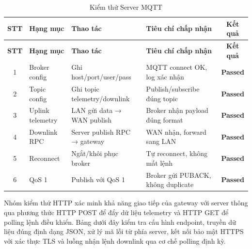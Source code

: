         \begin{longtable}{|c|p{3cm}|p{4cm}|p{5cm}|c|}
            \caption{Kiểm thử Server MQTT}
            \label{tab:test_mqtt} \\
            \hline
            \textbf{STT} & \textbf{Hạng mục} & \textbf{Thao tác} & \textbf{Tiêu chí chấp nhận} & \textbf{Kết quả} \\ \hline
            \endfirsthead

            \hline
            \textbf{STT} & \textbf{Hạng mục} & \textbf{Thao tác} & \textbf{Tiêu chí chấp nhận} & \textbf{Kết quả} \\ \hline
            \endhead

            \hline
            \endfoot
            \endlastfoot

            1 & Broker config & Ghi host/port/user/pass & MQTT connect OK, log xác nhận & \textcolor{modern_blue}{\textbf{Passed}} \\ \hline
            2 & Topic config & Ghi topic telemetry/downlink & Publish/subscribe đúng topic & \textcolor{modern_blue}{\textbf{Passed}} \\ \hline
            3 & Uplink telemetry & LAN gửi data → WAN publish & Broker nhận payload đúng format & \textcolor{modern_blue}{\textbf{Passed}} \\ \hline
            4 & Downlink RPC & Server publish RPC → gateway & WAN nhận, forward sang LAN & \textcolor{modern_blue}{\textbf{Passed}} \\ \hline
            5 & Reconnect & Ngắt/khôi phục broker & Tự reconnect, không mất lệnh & \textcolor{modern_blue}{\textbf{Passed}} \\ \hline
            6 & QoS 1 & Publish với QoS 1 & Broker gửi PUBACK, không duplicate & \textcolor{modern_blue}{\textbf{Passed}} \\ \hline
        \end{longtable}

        Nhóm kiểm thử HTTP xác minh khả năng giao tiếp của gateway với server thông qua phương thức HTTP POST để đẩy dữ liệu telemetry và HTTP GET để polling lệnh điều khiển. Bảng dưới đây kiểm tra cấu hình endpoint, truyền dữ liệu đúng định dạng JSON, xử lý mã lỗi từ phía server, kết nối bảo mật HTTPS với xác thực TLS và luồng nhận lệnh downlink qua cơ chế polling định kỳ.

